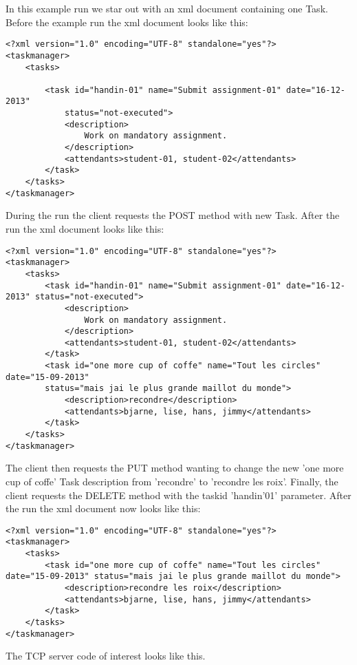 In this example run we star out with an xml document containing one Task. Before the example run the xml document looks like this:

\begin{lstlisting}[caption=xml before run]
<?xml version="1.0" encoding="UTF-8" standalone="yes"?>
<taskmanager>
	<tasks>
		
		<task id="handin-01" name="Submit assignment-01" date="16-12-2013"
			status="not-executed">
			<description>
				Work on mandatory assignment.
			</description>
			<attendants>student-01, student-02</attendants>
		</task>	
	</tasks>
</taskmanager>

\end{lstlisting}

During the run the client requests the POST method with new Task. After the run the xml document looks like this:

\begin{lstlisting}[caption=xml after POST]
<?xml version="1.0" encoding="UTF-8" standalone="yes"?>
<taskmanager>
	<tasks>
		<task id="handin-01" name="Submit assignment-01" date="16-12-2013" status="not-executed">
			<description>
				Work on mandatory assignment.
			</description>
			<attendants>student-01, student-02</attendants>
		</task>
		<task id="one more cup of coffe" name="Tout les circles" date="15-09-2013" 
		status="mais jai le plus grande maillot du monde">
			<description>recondre</description>
			<attendants>bjarne, lise, hans, jimmy</attendants>
		</task>
	</tasks>
</taskmanager>
\end{lstlisting}

The client then requests the PUT method wanting to change the new 'one more cup of coffe' Task description from 'recondre' to 'recondre les roix'. Finally, the client requests the DELETE method with the taskid 'handin'01' parameter. After the run the xml document now looks like this:

\begin{lstlisting}[caption=xml after PUT]
<?xml version="1.0" encoding="UTF-8" standalone="yes"?>
<taskmanager>
	<tasks>
		<task id="one more cup of coffe" name="Tout les circles" date="15-09-2013" status="mais jai le plus grande maillot du monde">
			<description>recondre les roix</description>
			<attendants>bjarne, lise, hans, jimmy</attendants>
		</task>
	</tasks>
</taskmanager>
\end{lstlisting}

\pagebreak

The TCP server code of interest looks like this.
% 


